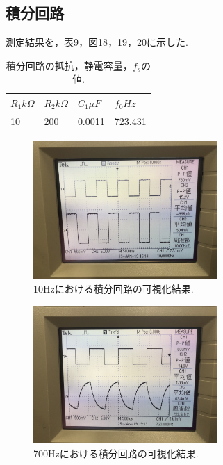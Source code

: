 \documentclass[twocolumn, 10pt,a4j]{jsarticle}
\begin{document}
        
        \subsection{積分回路}
        測定結果を，表9，図18，19，20に示した.

        \begin{table}[H]
          \centering
          \footnotesize
          \caption{積分回路の抵抗，静電容量，$f_{s}$の値.}
          \label{opeanpu_risouteki_tokusei}
          \begin{tabular}{llll} \hline
            $R_{1} k\Omega$ & $R_{2} k \Omega$& $C_{1} \mu F$& $f_{0} Hz$ \\ \hline
            10	&200	&0.0011	&723.431 \\ \hline 
          \end{tabular}
        \end{table}

        \begin{figure}[]
          \begin{center}
              \includegraphics[width=7cm]{../img/result_sekibun_10Hz.jpg}
              \caption{10Hzにおける積分回路の可視化結果.}
          \end{center}
        \end{figure}

        \begin{figure}[]
          \begin{center}
              \includegraphics[width=7cm]{../img/result_sekibun_700Hz.jpg}
              \caption{700Hzにおける積分回路の可視化結果.}
          \end{center}
        \end{figure}
\end{document}
